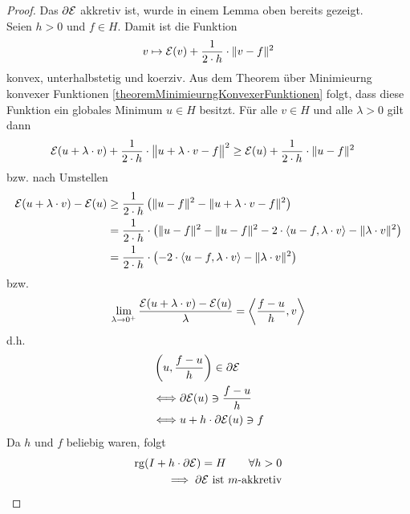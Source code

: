 \begin{proof}
	Das $\partial\mathcal{E}$ akkretiv ist, wurde in einem Lemma oben bereits gezeigt.\\
	Seien $h>0$ und $f\in H$. 
	Damit ist die Funktion
	\begin{align*}
		v\mapsto \mathcal{E}(v)+\frac{1}{2\cdot h}\cdot\Vert v-f\Vert^2
	\end{align*}
	konvex, unterhalbstetig und koerziv. 
	Aus dem Theorem über Minimieurng konvexer Funktionen \ref{theoremMinimieurngKonvexerFunktionen} folgt, dass diese Funktion ein globales Minimum $u\in H$ besitzt. 
	Für alle $v\in H$ und alle $\lambda>0$ gilt dann
	\begin{align*}
		\mathcal{E}(u+\lambda\cdot v)+\frac{1}{2\cdot h}\cdot\big\Vert u+\lambda\cdot v-f\big\Vert^2
		&\geq\mathcal{E}(u)+\frac{1}{2\cdot h}\cdot\Vert u-f\Vert^2
	\end{align*}
	bzw. nach Umstellen 
	\begin{align*}
		\mathcal{E}(u+\lambda\cdot v)-\mathcal{E}(u)
		&\geq\frac{1}{2\cdot h}\left(\Vert u-f\Vert^2-\Vert u+\lambda\cdot v-f\Vert^2\right)\\
		&=\frac{1}{2\cdot h}\cdot\left(\Vert u-f\Vert^2-\Vert u-f\Vert^2-2\cdot\langle u-f,\lambda\cdot v\rangle-\Vert \lambda\cdot v\Vert^2\right)\\
		&=\frac{1}{2\cdot h}\cdot\left(-2\cdot\langle u-f,\lambda\cdot v\rangle-\Vert \lambda\cdot v\Vert^2\right)
	\end{align*}
	bzw.
	\begin{align*}
		\lim\limits_{\lambda\to 0^+}\frac{\mathcal{E}(u+\lambda\cdot v)-\mathcal{E}(u)}{\lambda}=\left\langle\frac{f-u}{h},v\right\rangle
	\end{align*}
	d.h. 
	\begin{align*}
		&\left( u,\frac{f-u}{h}\right)\in\partial\mathcal{E}\\
		&\Longleftrightarrow\partial\mathcal{E}(u)\ni\frac{f-u}{h}\\
		&\Longleftrightarrow u+h\cdot\partial\mathcal{E}(u)\ni f
	\end{align*}
	Da $h$ und $f$ beliebig waren, folgt
	\begin{align*}
		\operatorname{rg}(I+h\cdot\partial\mathcal{E})=H\qquad\forall h>0\\
		\implies\partial\mathcal{E}\text{ ist $m$-akkretiv}
	\end{align*}
\end{proof}


